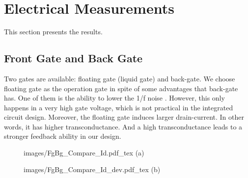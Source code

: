 \section{Electrical Measurements}
This section presents the results.

\subsection*{Front Gate and Back Gate}
Two gates are available: floating gate (liquid gate) and back-gate.
We choose floating gate as the operation gate in spite of some advantages that back-gate has.
One of them is the ability to lower the 1/f noise \cite{C7, C8}.
However, this only happens in a very high gate voltage, which is not practical in the integrated circuit design.
Moreover, the floating gate induces larger drain-current.
In other words, it has higher transconductance. And a high transconductance leads to a stronger feedback ability in our design.

%


\begin{figure}[!htbp]
    \centering
    \begin{minipage}[t][0.1\textheight]{1\textwidth}
        \centering
        \def\svgwidth{10cm}
        \fontsize{6}{15}\selectfont
         {images/FgBg_Compare_Id.pdf_tex}
        (a)
    \end{minipage}
    \vfill
    \begin{minipage}[t][0.1\textheight]{1\textwidth}
        \centering
        \def\svgwidth{10cm}
        \fontsize{6}{15}\selectfont
         {images/FgBg_Compare_Id_dev.pdf_tex}
        (b)
    \end{minipage}
    \caption{}
    \label{fig:IdVgandgbsId}
\end{figure}

